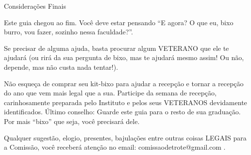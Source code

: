 \begin{secao}{Considerações Finais}

Este guia chegou ao fim. Você deve estar pensando ``E agora? O que eu, bixo burro, vou fazer,
sozinho nessa faculdade?''.


Se precisar de alguma ajuda, basta procurar algum VETERANO que ele te ajudará (ou rirá 
da sua pergunta de bixo, mas te ajudará mesmo assim! Ou não, depende, mas não custa nada
 tentar!).


Não esqueça de comprar seu kit-bixo para ajudar a recepção e tornar a recepção do ano que vem mais legal que a sua.
Participe da semana de recepção, carinhosamente preparada pelo Instituto e pelos seus VETERANOS devidamente identificados.
Último conselho: Guarde este guia para o resto de sua graduação. Por mais ``bixo'' que seja, você precisará dele.


Qualquer sugestão, elogio, presentes, bajulações entre outras coisas LEGAIS para a Comissão, você receberá atenção no email: comissaodetrote@gmail.com .


\end{secao}
